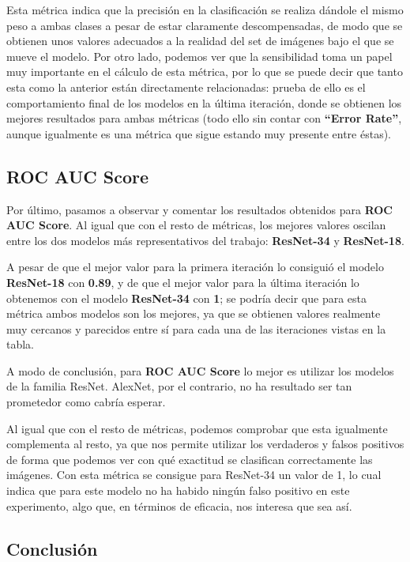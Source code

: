 Esta métrica indica que la precisión en la clasificación se realiza dándole el mismo peso a ambas clases a pesar de estar claramente descompensadas, de modo que se obtienen unos valores adecuados a la realidad del set de imágenes bajo el que se mueve el modelo. Por otro lado, podemos ver que la sensibilidad toma un papel muy importante en el cálculo de esta métrica, por lo que se puede decir que tanto esta como la anterior están directamente relacionadas: prueba de ello es el comportamiento final de los modelos en la última iteración, donde se obtienen los mejores resultados para ambas métricas (todo ello sin contar con \textbf{``Error Rate''}, aunque igualmente es una métrica que sigue estando muy presente entre éstas).

\subsection{ROC AUC Score}

Por último, pasamos a observar y comentar los resultados obtenidos para \textbf{ROC AUC Score}. Al igual que con el resto de métricas, los mejores valores oscilan entre los dos modelos más representativos del trabajo: \textbf{ResNet-34} y \textbf{ResNet-18}.

A pesar de que el mejor valor para la primera iteración lo consiguió el modelo \textbf{ResNet-18} con \textbf{0.89}, y de que el mejor valor para la última iteración lo obtenemos con el modelo \textbf{ResNet-34} con \textbf{1}; se podría decir que para esta métrica ambos modelos son los mejores, ya que se obtienen valores realmente muy cercanos y parecidos entre sí para cada una de las iteraciones vistas en la tabla.

A modo de conclusión, para \textbf{ROC AUC Score} lo mejor es utilizar los modelos de la familia ResNet. AlexNet, por el contrario, no ha resultado ser tan prometedor como cabría esperar.

Al igual que con el resto de métricas, podemos comprobar que esta igualmente complementa al resto, ya que nos permite utilizar los verdaderos y falsos positivos de forma que podemos ver con qué exactitud se clasifican correctamente las imágenes. Con esta métrica se consigue para ResNet-34 un valor de 1, lo cual indica que para este modelo no ha habido ningún falso positivo en este experimento, algo que, en términos de eficacia, nos interesa que sea así.

\subsection{Conclusión}

